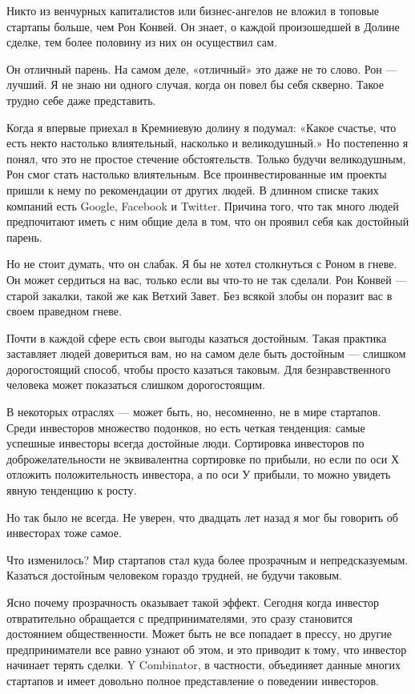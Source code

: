 \documentclass[ebook,12pt,oneside,openany]{memoir}
\begin{document}
\maketitle

Никто из венчурных капиталистов или бизнес-ангелов не вложил в топовые
стартапы больше, чем Рон Конвей. Он знает, о каждой произошедшей в
Долине сделке, тем более половину из них он осуществил сам.

Он отличный парень. На самом деле, «отличный» это даже не то слово.
Рон — лучший. Я не знаю ни одного случая, когда он повел бы себя
скверно. Такое трудно себе даже представить.

Когда я впервые приехал в Кремниевую долину я подумал: «Какое счастье,
что есть некто настолько влиятельный, насколько и великодушный.» Но
постепенно я понял, что это не простое стечение обстоятельств. Только
будучи великодушным, Рон смог стать настолько влиятельным. Все
проинвестированные им проекты пришли к нему по рекомендации от других
людей. В длинном списке таких компаний есть Google, Facebook и
Twitter. Причина того, что так много людей предпочитают иметь с ним
общие дела в том, что он проявил себя как достойный парень.

Но не стоит думать, что он слабак. Я бы не хотел столкнуться с Роном в
гневе. Он может сердиться на вас, только если вы что-то не так
сделали. Рон Конвей — старой закалки, такой же как Ветхий Завет. Без
всякой злобы он поразит вас в своем праведном гневе.

Почти в каждой сфере есть свои выгоды казаться достойным. Такая
практика заставляет людей довериться вам, но на самом деле быть
достойным — слишком дорогостоящий способ, чтобы просто казаться
таковым. Для безнравственного человека может показаться слишком
дорогостоящим.

В некоторых отраслях — может быть, но, несомненно, не в мире
стартапов. Среди инвесторов множество подонков, но есть четкая
тенденция: самые успешные инвесторы всегда достойные люди. Сортировка
инвесторов по доброжелательности не эквивалентна сортировке по
прибыли, но если по оси Х отложить положительность инвестора, а по оси
У прибыли, то можно увидеть явную тенденцию к росту.

Но так было не всегда. Не уверен, что двадцать лет назад я мог бы
говорить об инвесторах тоже самое.

Что изменилось? Мир стартапов стал куда более прозрачным и
непредсказуемым. Казаться достойным человеком гораздо трудней, не
будучи таковым.

Ясно почему прозрачность оказывает такой эффект. Сегодня когда
инвестор отвратительно обращается с предпринимателями, это сразу
становится достоянием общественности. Может быть не все попадает в
прессу, но другие предприниматели все равно узнают об этом, и это
приводит к тому, что инвестор начинает терять сделки. Y Combinator, в
частности, объединяет данные многих стартапов и имеет довольно полное
представление о поведении инвесторов.
\end{document}
